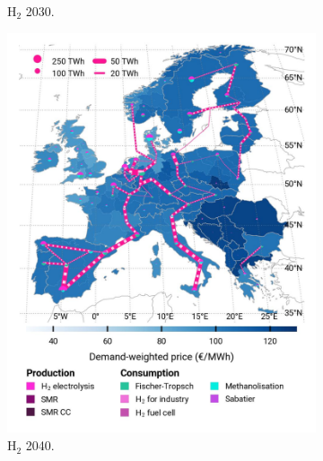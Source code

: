 \documentclass[pdflatex,sn-nature]{sn-jnl}%
\theoremstyle{thmstyleone}%
\theoremstyle{thmstyletwo}%
\theoremstyle{thmstylethree}%
\begin{document}
\begin{figure}[htbp]
\begin{subfigure}[t]{0.32\textwidth}
      \caption{H$_2$ 2030.}
      \label{fig:PCI_lt_2030_h2}
  \end{subfigure}
  \begin{subfigure}[t]{0.32\textwidth}
      \vspace{0pt}
      \includegraphics[width=1\textwidth]{figures/pci___base_s_adm___2040-balance_map_H2.jpg}
      \caption{H$_2$ 2040.}
      \label{fig:PCI_lt_2040_h2}
  \end{subfigure}
  \begin{subfigure}[t]{0.32\textwidth}
    \vspace{0pt}

\end{subfigure}
\end{figure}
\end{document}

